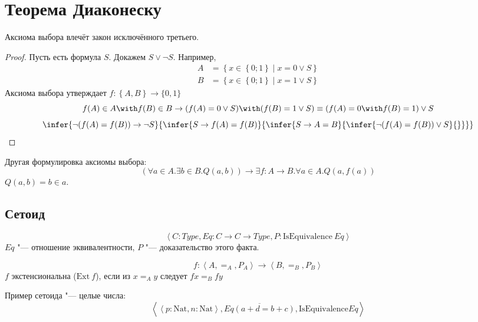 \section{\texorpdfstring{Теорема Диаконеску}{}}

\begin{theorem}
    Аксиома выбора влечёт закон исключённого третьего.
\end{theorem}

\begin{proof}
    Пусть есть формула $S$. Докажем $S \vee \neg S$.
    Например,
    \begin{align*}
        A &= \left\{ x \in \left\{0;1\right\} \mid x = 0 \vee S \right\} \\
        B &= \left\{ x \in \left\{0;1\right\} \mid x = 1 \vee S \right\}
    \end{align*}
    Аксиома выбора утверждает $f : \left\{A, B\right\} \to \{0, 1\}$
    \[
        f(A) \in A \with f(B) \in B \to (f(A) = 0 \vee S) \with (f(B) = 1 \vee S) \equiv (f(A) = 0 \with f(B) = 1) \vee S
    \]
    \[
        \infer{\neg (f(A) = f(B)) \to \neg S}
        {\infer{S \to f(A) = f(B)}
        {\infer{S \to A = B}
        {\infer{\neg (f(A) = f(B)) \vee S }
        {}}}}
    \]
\todo
\end{proof}

Другая формулировка аксиомы выбора:
\[
    (\forall a \in A . \exists b \in B . Q(a, b)) \to \exists f : A \to B . \forall a \in A . Q(a, f(a))
\]
$Q(a, b) = b \in a$.

\subsection{\texorpdfstring{Сетоид}{Setoid}}

\begin{definition}
    \[
        \left<C : Type, Eq : C \to C \to Type, P : \mathrm{IsEquivalence}~Eq\right>
    \]
    $Eq$ "--- отношение эквивалентности, $P$ "--- доказательство этого факта.
\end{definition}
\begin{definition}[экстенциональность]
    \[
        f : \left< A, =_A, P_A\right> \to \left<B, =_B, P_B\right>
    \]
    $f$ экстенсиональна ($\mathrm{Ext}~f$), если из $x =_A y$ следует $f x =_B f y$
\end{definition}

Пример сетоида "--- целые числа:
\[
    \left< \left<p : \mathrm{Nat}, n : \mathrm{Nat}\right>, \overline{Eq(a+d=b+c)}, \mathrm{IsEquivalence} Eq\right>
\]
